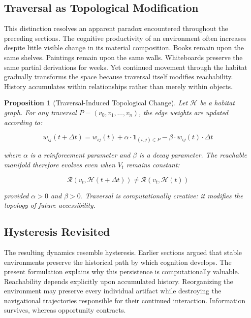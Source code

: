 \documentclass[12pt,oneside]{article}
\newtheorem{proposition}[definition]{Proposition}
\theoremstyle{remark}
\begin{document}
\subsection{Traversal as Topological Modification}

This distinction resolves an apparent paradox encountered throughout the preceding sections. The cognitive productivity of an environment often increases despite little visible change in its material composition. Books remain upon the same shelves. Paintings remain upon the same walls. Whiteboards preserve the same partial derivations for weeks. Yet continued movement through the habitat gradually transforms the space because traversal itself modifies reachability. History accumulates within relationships rather than merely within objects.

\begin{proposition}[Traversal-Induced Topological Change]
Let \(\mathcal{H}\) be a habitat graph. For any traversal \(P = (v_0, v_1, \ldots, v_n)\), the edge weights are updated according to:

\[
w_{ij}(t + \Delta t) = w_{ij}(t) + \alpha \cdot \mathbf{1}_{(i,j) \in P} - \beta \cdot w_{ij}(t) \cdot \Delta t
\]

where \(\alpha\) is a reinforcement parameter and \(\beta\) is a decay parameter. The reachable manifold therefore evolves even when \(V_t\) remains constant:

\[
\mathcal{R}(v_t, \mathcal{H}(t + \Delta t)) \neq \mathcal{R}(v_t, \mathcal{H}(t))
\]

provided \(\alpha > 0\) and \(\beta > 0\). Traversal is computationally creative: it modifies the topology of future accessibility.
\end{proposition}

\subsection{Hysteresis Revisited}

The resulting dynamics resemble hysteresis. Earlier sections argued that stable environments preserve the historical path by which cognition develops. The present formulation explains why this persistence is computationally valuable. Reachability depends explicitly upon accumulated history. Reorganizing the environment may preserve every individual artifact while destroying the navigational trajectories responsible for their continued interaction. Information survives, whereas opportunity contracts.
\end{document}

